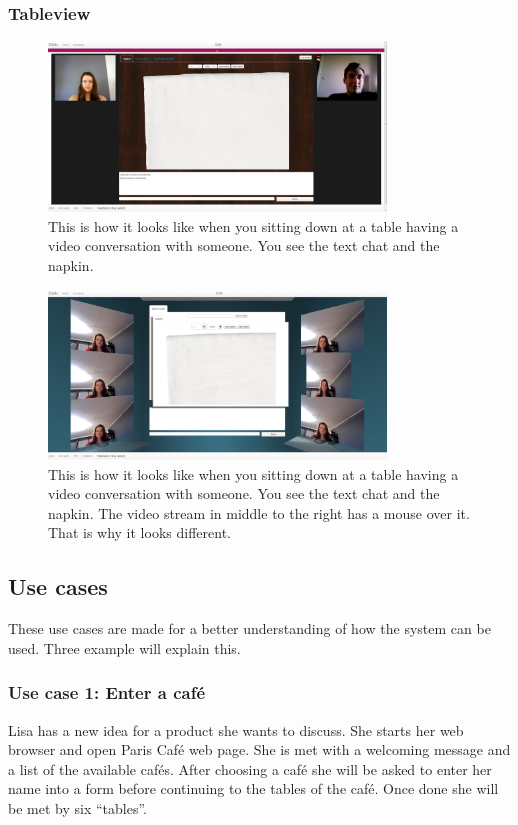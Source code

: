 \documentclass[12pt, titlepage]{article}
\begin{document}
\subsubsection{Tableview}
\begin{figure}[H]
  \centering
	\includegraphics[width=0.8\textwidth,keepaspectratio]{sittingdown2D.png}
  \caption{This is how it looks like when you sitting down at a table having a video conversation with someone. You see the text chat and the napkin.}
\end{figure}
\begin{figure}[H]
  \centering
	\includegraphics[width=0.8\textwidth,keepaspectratio]{sittingdown3D.png}
  \caption{This is how it looks like when you sitting down at a table having a video conversation with someone. You see the text chat and the napkin. The video stream in middle to the right has a mouse over it. That is why it looks different.}
\end{figure}
\subsection{Use cases}
These use cases are made for a better understanding of how the system can be used. Three example will explain this.
\subsubsection{Use case 1: Enter a café}
Lisa has a new idea for a product she wants to discuss. She starts her web browser and open Paris Café web page. She is met with a welcoming message and a list of the available cafés. After choosing a café she will be asked to enter her name into a form before continuing to the tables of the café. Once done she will be met by six “tables”. 
\end{document}
